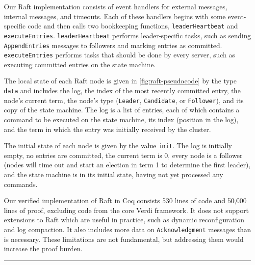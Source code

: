\begin{sloppypar}
Our Raft implementation consists of event handlers
for external messages, internal messages, and timeouts.
Each of these handlers begins with some event-specific code
and then calls two bookkeeping functions,
\texttt{leaderHeartbeat} and \texttt{executeEntries}.
\texttt{leaderHeartbeat} performs leader-specific tasks,
such as sending \texttt{AppendEntries} messages to followers
and marking entries as committed.
\texttt{executeEntries} performs tasks
that should be done by every server,
such as executing committed entries on the state machine.
\end{sloppypar}


The local state of each Raft node is given in \cref{fig:raft-pseudocode}
by the type \texttt{data}
and includes the log,
the index of the most recently committed entry,
the node's current term,
the node's type (\texttt{Leader}, \texttt{Candidate}, or \texttt{Follower}),
and its copy of the state machine.
The log is a list of entries,
each of which contains
a command to be executed on the state machine,
its index (position in the log),
and the term in which the entry was initially received by the cluster.

The initial state of each node is given
  by the value \texttt{init}.
The log is initially empty,
  no entries are committed,
  the current term is 0,
  every node is a follower
  (nodes will time out and start an election in term 1 to determine the first leader),
  and the state machine is in its initial state,
  having not yet processed any commands.

Our verified implementation of Raft in Coq
  consists 530 lines of code
  and 50,000 lines of proof,
  excluding code from
  the core Verdi framework. It does not support extensions to Raft
  which are useful in practice, such as dynamic reconfiguration and
  log compaction. It also includes more data on \texttt{Acknowledgment}
  messages than is necessary. These limitations are not fundamental,
  but addressing them would increase the proof burden.


\hrule{}

